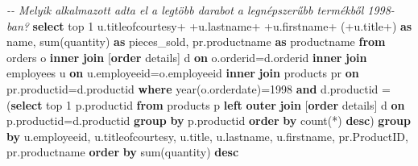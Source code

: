 \documentclass[
  magyar,
]{article}
\newenvironment{Shaded}{}{}
\newcommand{\CommentTok}[1]{\textcolor[rgb]{0.38,0.63,0.69}{\textit{#1}}}
\newcommand{\DataTypeTok}[1]{\textcolor[rgb]{0.56,0.13,0.00}{#1}}
\newcommand{\DecValTok}[1]{\textcolor[rgb]{0.25,0.63,0.44}{#1}}
\newcommand{\FunctionTok}[1]{\textcolor[rgb]{0.02,0.16,0.49}{#1}}
\newcommand{\KeywordTok}[1]{\textcolor[rgb]{0.00,0.44,0.13}{\textbf{#1}}}
\newcommand{\NormalTok}[1]{#1}
\newcommand{\OperatorTok}[1]{\textcolor[rgb]{0.40,0.40,0.40}{#1}}
\newcommand{\StringTok}[1]{\textcolor[rgb]{0.25,0.44,0.63}{#1}}
\begin{document}
\begin{Shaded}
\begin{Highlighting}[]
\CommentTok{{-}{-} Melyik alkalmazott adta el a legtöbb darabot a legnépszerűbb termékből 1998{-}ban?}
\KeywordTok{select}\NormalTok{ top }\DecValTok{1}\NormalTok{ u.titleofcourtesy}\OperatorTok{+}\StringTok{\textquotesingle{} \textquotesingle{}}\OperatorTok{+}\NormalTok{u.lastname}\OperatorTok{+}\StringTok{\textquotesingle{} \textquotesingle{}}\OperatorTok{+}\NormalTok{u.firstname}\OperatorTok{+}\StringTok{\textquotesingle{} (\textquotesingle{}}\OperatorTok{+}\NormalTok{u.title}\OperatorTok{+}\StringTok{\textquotesingle{})\textquotesingle{}} \KeywordTok{as}\NormalTok{ name,}
  \FunctionTok{sum}\NormalTok{(quantity) }\KeywordTok{as}\NormalTok{ pieces\_sold,}
\NormalTok{  pr.productname }\KeywordTok{as}\NormalTok{ productname}
\KeywordTok{from}\NormalTok{ orders o }\KeywordTok{inner} \KeywordTok{join}\NormalTok{ [}\KeywordTok{order}\NormalTok{ details] d }\KeywordTok{on}\NormalTok{ o.orderid}\OperatorTok{=}\NormalTok{d.orderid}
  \KeywordTok{inner} \KeywordTok{join}\NormalTok{ employees u }\KeywordTok{on}\NormalTok{ u.employeeid}\OperatorTok{=}\NormalTok{o.employeeid}
  \KeywordTok{inner} \KeywordTok{join}\NormalTok{ products pr }\KeywordTok{on}\NormalTok{ pr.productid}\OperatorTok{=}\NormalTok{d.productid}
\KeywordTok{where} \DataTypeTok{year}\NormalTok{(o.orderdate)}\OperatorTok{=}\DecValTok{1998} \KeywordTok{and}\NormalTok{ d.productid }\OperatorTok{=}
\NormalTok{  (}\KeywordTok{select}\NormalTok{ top }\DecValTok{1}\NormalTok{ p.productid}
  \KeywordTok{from}\NormalTok{ products p }\KeywordTok{left} \KeywordTok{outer} \KeywordTok{join}\NormalTok{ [}\KeywordTok{order}\NormalTok{ details] d }\KeywordTok{on}\NormalTok{ p.productid}\OperatorTok{=}\NormalTok{d.productid}
  \KeywordTok{group} \KeywordTok{by}\NormalTok{ p.productid}
  \KeywordTok{order} \KeywordTok{by} \FunctionTok{count}\NormalTok{(}\OperatorTok{*}\NormalTok{) }\KeywordTok{desc}\NormalTok{)}
\KeywordTok{group} \KeywordTok{by}\NormalTok{ u.employeeid, u.titleofcourtesy, u.title, u.lastname, u.firstname,}
\NormalTok{pr.ProductID, pr.productname}
\KeywordTok{order} \KeywordTok{by} \FunctionTok{sum}\NormalTok{(quantity) }\KeywordTok{desc}
\end{Highlighting}
\end{Shaded}
\end{document}
